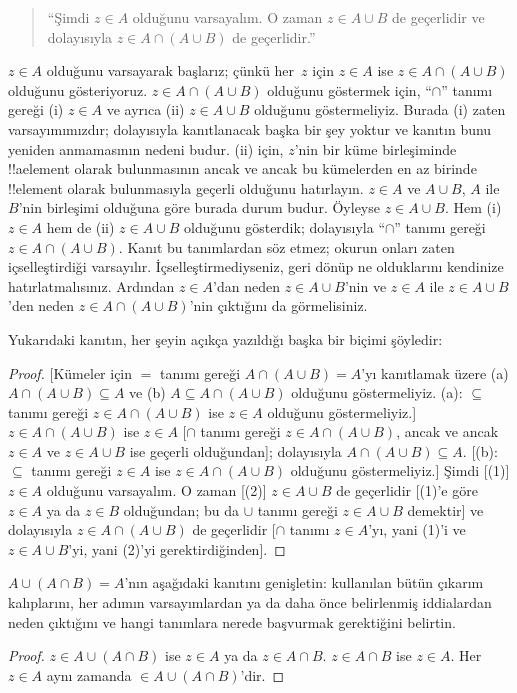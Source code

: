 \begin{quote}
``Şimdi $z \in A$ olduğunu varsayalım. O zaman $z \in A \cup B$ de
geçerlidir ve dolayısıyla $z \in A \cap (A \cup B)$ de geçerlidir.''
\end{quote}

$z \in A$ olduğunu varsayarak başlarız; çünkü her~$z$ için $z \in A$
ise $z \in A \cap (A \cup B)$ olduğunu gösteriyoruz. $z \in A
\cap (A \cup B)$ olduğunu göstermek için, ``$\cap$'' tanımı gereği (i)
$z \in A$ ve ayrıca (ii) $z \in A \cup B$ olduğunu göstermeliyiz.
Burada (i) zaten varsayımımızdır; dolayısıyla kanıtlanacak başka bir
şey yoktur ve kanıtın bunu yeniden anmamasının nedeni budur. (ii) için,
$z$'nin bir küme birleşiminde !!a{element} olarak bulunmasının ancak ve ancak bu
kümelerden en az birinde !!{element} olarak bulunmasıyla geçerli olduğunu
hatırlayın. $z \in A$ ve $A \cup B$, $A$ ile $B$'nin birleşimi olduğuna
göre burada durum budur. Öyleyse $z \in A \cup B$. Hem (i) $z \in A$
hem de (ii) $z \in A \cup B$ olduğunu gösterdik; dolayısıyla ``$\cap$''
tanımı gereği $z \in A \cap (A \cup B)$. Kanıt bu tanımlardan söz etmez;
okurun onları zaten içselleştirdiği varsayılır. İçselleştirmediyseniz,
geri dönüp ne olduklarını kendinize hatırlatmalısınız. Ardından $z \in
A$'dan neden $z \in A \cup B$'nin ve $z \in A$ ile $z \in A \cup B$'den
neden $z \in A \cap (A \cup B)$'nin çıktığını da görmelisiniz.

Yukarıdaki kanıtın, her şeyin açıkça yazıldığı başka bir biçimi şöyledir:
\begin{proof}{}
[Kümeler için $=$ tanımı gereği $A \cap (A \cup B) = A$'yı kanıtlamak
  üzere (a) $A \cap (A \cup B) \subseteq A$ ve (b) $A \subseteq A \cap
  (A \cup B)$ olduğunu göstermeliyiz. (a): $\subseteq$ tanımı gereği $z
  \in A \cap (A \cup B)$ ise $z \in A$ olduğunu göstermeliyiz.] $z \in
A \cap (A \cup B)$ ise $z \in A$ [$\cap$ tanımı gereği $z \in A \cap
  (A \cup B)$, ancak ve ancak $z \in A$ ve $z \in A \cup B$ ise
  geçerli olduğundan]; dolayısıyla $A \cap (A \cup B) \subseteq A$.
[(b): $\subseteq$ tanımı gereği $z \in A$ ise $z \in A \cap (A \cup
  B)$ olduğunu göstermeliyiz.] Şimdi [(1)] $z \in A$ olduğunu
varsayalım. O zaman [(2)] $z \in A \cup B$ de geçerlidir [(1)'e göre
  $z \in A$ ya da $z \in B$ olduğundan; bu da $\cup$ tanımı gereği $z
  \in A \cup B$ demektir] ve dolayısıyla $z \in A \cap (A \cup B)$ de
geçerlidir [$\cap$ tanımı $z \in A$'yı, yani (1)'i ve $z \in A \cup B$'yi,
  yani (2)'yi gerektirdiğinden].
\end{proof}

\begin{prob}
$A \cup (A \cap B) = A$'nın aşağıdaki kanıtını genişletin: kullanılan
bütün çıkarım kalıplarını, her adımın varsayımlardan ya da daha önce
belirlenmiş iddialardan neden çıktığını ve hangi tanımlara nerede
başvurmak gerektiğini belirtin.
\begin{proof}
  $z \in A \cup (A \cap B)$ ise $z \in A$ ya da $z \in A \cap B$. $z
  \in A \cap B$ ise $z \in A$. Her $z \in A$ aynı zamanda $\in A \cup
  (A \cap B)$'dir.
\end{proof}
\end{prob}

